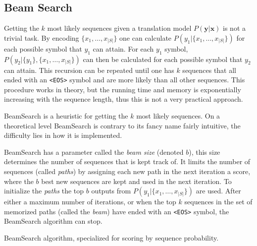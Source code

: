 \subsection{Beam Search}

Getting the $k$ most likely sequences given a translation model $P(\mathbf{y}|\mathbf{x})$ is not a trivial task. By encoding $\{x_1, \dots, x_{|S|}\}$ one can calculate $P(y_1| \{x_1, \dots, x_{|S|}\})$ for each possible symbol that $y_1$ can attain. For each $y_1$ symbol, $P(y_2| \{y_1\}, \{x_1, \dots, x_{|S|}\})$ can then be calculated for each possible symbol that $y_2$ can attain. This recursion can be repeated until one has $k$ sequences that all ended with an \texttt{<EOS>} symbol and are more likely than all other sequences. This procedure works in theory, but the running time and memory is exponentially increasing with the sequence length, thus this is not a very practical approach.

BeamSearch is a heuristic for getting the $k$ most likely sequences. On a theoretical level BeamSearch is contrary to its fancy name fairly intuitive, the difficulty lies in how it is implemented.

BeamSearch has a parameter called the \textit{beam size} (denoted $b$), this size determines the number of sequences that is kept track of. It limits the number of sequences (called \textit{paths}) by assigning each new path in the next iteration a score, where the $b$ best new sequences are kept and used in the next iteration. To initialize the \textit{paths} the top $b$ outputs from $P(y_1| \{x_1, \dots, x_{|S|}\})$ are used. After either a maximum number of iterations, or when the top $k$ sequences in the set of memorized paths (called the \textit{beam}) have ended with an \texttt{<EOS>} symbol, the BeamSearch algorithm can stop.

\begin{algorithm}[H]
  \caption{BeamSearch algorithm, specialized for scoring by sequence probability.}
  \begin{algorithmic}[1]
      \Repeat
        \EndFor
      \State {}
    \EndFunction
  \end{algorithmic}
\end{algorithm}


